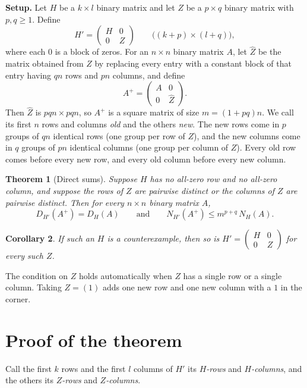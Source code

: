 \documentclass[11pt]{article}
\theoremstyle{plain}
\newtheorem{theorem}{Theorem}
\newtheorem{corollary}[theorem]{Corollary}
\theoremstyle{definition}
\theoremstyle{remark}
\begin{document}
\medskip
\noindent\textbf{Setup.} Let $H$ be a $k \times l$ binary matrix and let $Z$ be a $p \times q$
binary matrix with $p, q \ge 1$. Define
\[
H' = \begin{pmatrix} H & 0 \\ 0 & Z \end{pmatrix}
\qquad \bigl((k+p) \times (l+q)\bigr),
\]
where each $0$ is a block of zeros. For an $n \times n$ binary matrix $A$, let $\widehat{Z}$ be
the matrix obtained from $Z$ by replacing every entry with a constant block of that entry having
$qn$ rows and $pn$ columns, and define
\[
A^+ = \begin{pmatrix} A & 0 \\ 0 & \widehat{Z} \end{pmatrix}.
\]
Then $\widehat{Z}$ is $pqn \times pqn$, so $A^+$ is a square matrix of size $m = (1+pq)n$. We
call its first $n$ rows and columns \emph{old} and the others \emph{new}. The new rows come in
$p$ groups of $qn$ identical rows (one group per row of $Z$), and the new columns come in $q$
groups of $pn$ identical columns (one group per column of $Z$). Every old row comes before every
new row, and every old column before every new column.

\begin{theorem}[Direct sums]\label{thm:direct}
Suppose $H$ has no all-zero row and no all-zero column, and suppose the rows of $Z$ are pairwise
distinct or the columns of $Z$ are pairwise distinct. Then for every $n \times n$ binary matrix
$A$,
\[
D_{H'}(A^+) = D_H(A)
\qquad\text{and}\qquad
N_{H'}(A^+) \le m^{p+q}\, N_H(A).
\]
\end{theorem}

\begin{corollary}\label{cor:direct}
If such an $H$ is a counterexample, then so is
$H' = \begin{pmatrix} H & 0 \\ 0 & Z \end{pmatrix}$ for every such $Z$.
\end{corollary}

The condition on $Z$ holds automatically when $Z$ has a single row or a single column. Taking
$Z = (1)$ adds one new row and one new column with a $1$ in the corner.

\section{Proof of the theorem}

Call the first $k$ rows and the first $l$ columns of $H'$ its \emph{$H$-rows} and
\emph{$H$-columns}, and the others its \emph{$Z$-rows} and \emph{$Z$-columns}.
\end{document}
